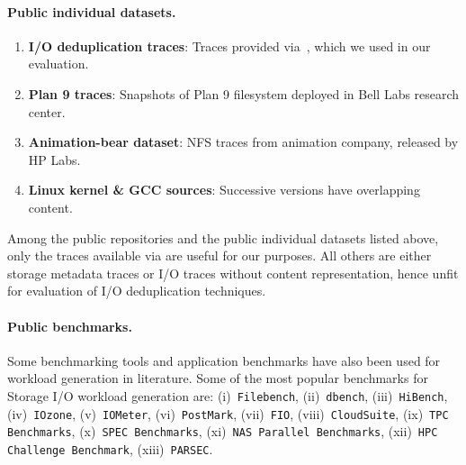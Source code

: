 \paragraph{Public individual datasets.}
\begin{enumerate}
		\singlespacing
    \item \textbf{I/O deduplication traces}: Traces provided via~\cite{iodedup}, which we used in our evaluation.
    \item \textbf{Plan 9 traces}: Snapshots of Plan 9 filesystem deployed in Bell Labs research center. 
    \item \textbf{Animation-bear dataset}: NFS traces from animation company, released by HP Labs.
    \item \textbf{Linux kernel \& GCC sources}: Successive versions have overlapping content.
\end{enumerate}

Among the public repositories and the public individual datasets 
listed above, only the traces available via \cite{iodedup} 
are useful for our purposes.
All others are either storage metadata traces or I/O traces
without content representation, hence unfit for evaluation of I/O deduplication
techniques.

\paragraph{Public benchmarks.}
Some benchmarking tools and application benchmarks have also been used for
workload generation in literature. Some of the most popular benchmarks
for Storage I/O workload generation are: (i)~\texttt{Filebench}, 
(ii)~\texttt{dbench},
(iii)~\texttt{HiBench},
(iv)~\texttt{IOzone},
(v)~\texttt{IOMeter},
(vi)~\texttt{PostMark},
(vii)~\texttt{FIO},
(viii)~\texttt{CloudSuite},
(ix)~\texttt{TPC Benchmarks},
(x)~\texttt{SPEC Benchmarks},
(xi)~\texttt{NAS Parallel Benchmarks},
(xii)~\texttt{HPC Challenge Benchmark},
(xiii)~\texttt{PARSEC}.

